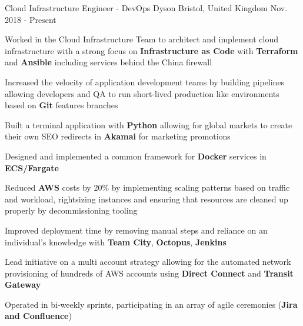 
\begin{cventries}

  \cventry
    {Cloud Infrastructure Engineer - DevOps} %
    {Dyson} %
    {Bristol, United Kingdom} %
    {Nov. 2018 - Present} %
    {
      \begin{cvitems} %
        \item {Worked in the Cloud Infrastructure Team to architect and implement cloud infrastructure with a strong focus on \textbf{Infrastructure as Code} with \textbf{Terraform} and \textbf{Ansible} including services behind the China firewall}
        \item {Increased the velocity of application development teams by building pipelines allowing developers and QA to run short-lived production like environments based on \textbf{Git} features branches}
        \item {Built a terminal application with \textbf{Python} allowing for global markets to create their own SEO redirects in \textbf{Akamai} for marketing promotions}
        \item {Designed and implemented a common framework for \textbf{Docker} services in \textbf{ECS/Fargate}}
        \item {Reduced \textbf{AWS} costs by 20\% by implementing scaling patterns based on traffic and workload, rightsizing instances and ensuring that resources are cleaned up properly by decommissioning tooling}
        \item {Improved deployment time by removing manual steps and reliance on an individual’s knowledge with \textbf{Team City}, \textbf{Octopus}, \textbf{Jenkins}}
        \item {Lead initiative on a multi account strategy allowing for the automated network provisioning of hundreds of AWS accounts using \textbf{Direct Connect} and \textbf{Transit Gateway}}
        \item {Operated in bi-weekly sprints, participating in an array of agile ceremonies (\textbf{Jira and Confluence})}
      \end{cvitems}
    }


\end{cventries}
